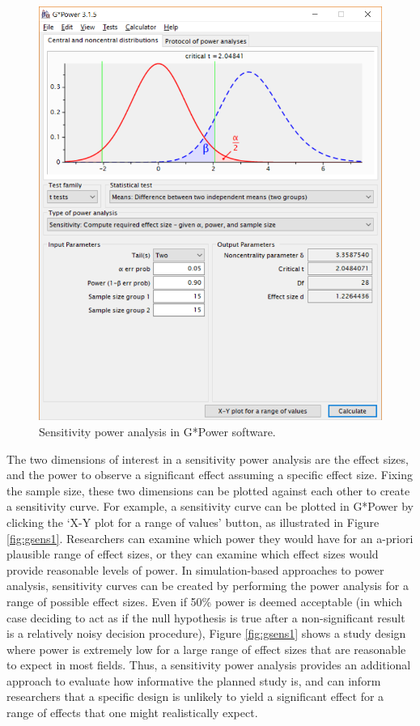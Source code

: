 \documentclass[
  oneside]{krantz}
\begin{document}
\begin{figure}

{\centering \includegraphics[width=1\linewidth]{images/gpow_sensitivity_1} 

}

\caption{Sensitivity power analysis in G*Power software.}\label{fig:gsens0}
\end{figure}

The two dimensions of interest in a sensitivity power analysis are the effect sizes, and the power to observe a significant effect assuming a specific effect size. Fixing the sample size, these two dimensions can be plotted against each other to create a sensitivity curve. For example, a sensitivity curve can be plotted in G*Power by clicking the `X-Y plot for a range of values' button, as illustrated in Figure \ref{fig:gsens1}. Researchers can examine which power they would have for an a-priori plausible range of effect sizes, or they can examine which effect sizes would provide reasonable levels of power. In simulation-based approaches to power analysis, sensitivity curves can be created by performing the power analysis for a range of possible effect sizes. Even if 50\% power is deemed acceptable (in which case deciding to act as if the null hypothesis is true after a non-significant result is a relatively noisy decision procedure), Figure \ref{fig:gsens1} shows a study design where power is extremely low for a large range of effect sizes that are reasonable to expect in most fields. Thus, a sensitivity power analysis provides an additional approach to evaluate how informative the planned study is, and can inform researchers that a specific design is unlikely to yield a significant effect for a range of effects that one might realistically expect.
\end{document}
